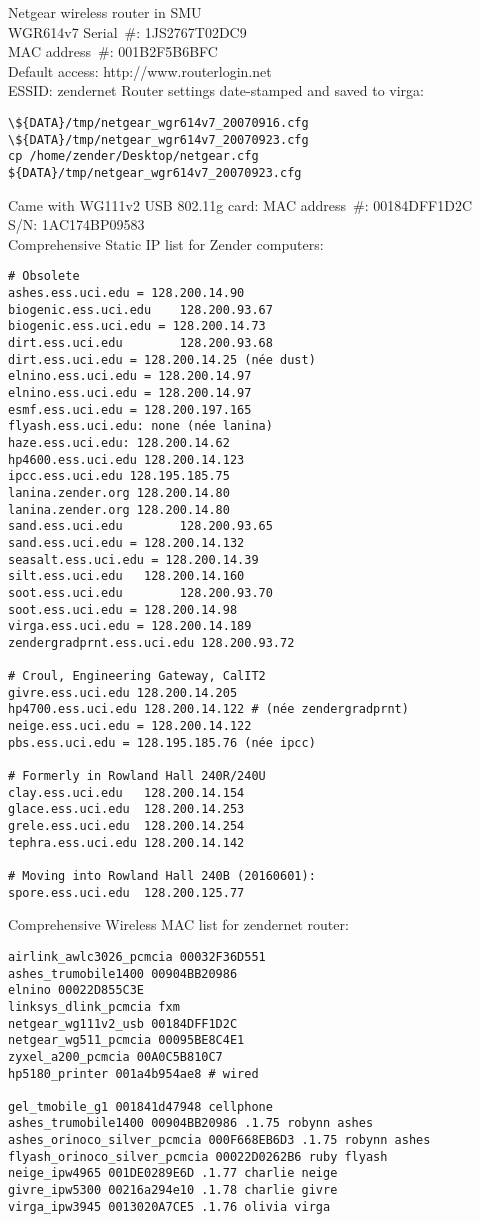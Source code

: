 \documentclass[12pt,twoside]{article}
\begin{document}
Netgear wireless router in SMU\\
WGR614v7
Serial~\#: 1JS2767T02DC9 \\
MAC address~\#: 001B2F5B6BFC \\
Default access: http://www.routerlogin.net \\
ESSID: zendernet
Router settings date-stamped and saved to virga: 
\begin{verbatim}
\${DATA}/tmp/netgear_wgr614v7_20070916.cfg
\${DATA}/tmp/netgear_wgr614v7_20070923.cfg
cp /home/zender/Desktop/netgear.cfg ${DATA}/tmp/netgear_wgr614v7_20070923.cfg
\end{verbatim}
Came with WG111v2 USB 802.11g card:
MAC address~\#: 00184DFF1D2C \\
S/N: 1AC174BP09583 \\

Comprehensive Static IP list for Zender computers:
\begin{verbatim}
# Obsolete
ashes.ess.uci.edu = 128.200.14.90
biogenic.ess.uci.edu    128.200.93.67
biogenic.ess.uci.edu = 128.200.14.73
dirt.ess.uci.edu        128.200.93.68
dirt.ess.uci.edu = 128.200.14.25 (née dust)
elnino.ess.uci.edu = 128.200.14.97
elnino.ess.uci.edu = 128.200.14.97
esmf.ess.uci.edu = 128.200.197.165
flyash.ess.uci.edu: none (née lanina)
haze.ess.uci.edu: 128.200.14.62
hp4600.ess.uci.edu 128.200.14.123
ipcc.ess.uci.edu 128.195.185.75
lanina.zender.org 128.200.14.80
lanina.zender.org 128.200.14.80
sand.ess.uci.edu        128.200.93.65
sand.ess.uci.edu = 128.200.14.132
seasalt.ess.uci.edu = 128.200.14.39
silt.ess.uci.edu   128.200.14.160
soot.ess.uci.edu        128.200.93.70
soot.ess.uci.edu = 128.200.14.98
virga.ess.uci.edu = 128.200.14.189
zendergradprnt.ess.uci.edu 128.200.93.72

# Croul, Engineering Gateway, CalIT2
givre.ess.uci.edu 128.200.14.205
hp4700.ess.uci.edu 128.200.14.122 # (née zendergradprnt)
neige.ess.uci.edu = 128.200.14.122
pbs.ess.uci.edu = 128.195.185.76 (née ipcc)

# Formerly in Rowland Hall 240R/240U
clay.ess.uci.edu   128.200.14.154
glace.ess.uci.edu  128.200.14.253
grele.ess.uci.edu  128.200.14.254
tephra.ess.uci.edu 128.200.14.142

# Moving into Rowland Hall 240B (20160601):
spore.ess.uci.edu  128.200.125.77
\end{verbatim}

Comprehensive Wireless MAC list for zendernet router:
\begin{verbatim}
airlink_awlc3026_pcmcia 00032F36D551
ashes_trumobile1400 00904BB20986
elnino 00022D855C3E
linksys_dlink_pcmcia fxm
netgear_wg111v2_usb 00184DFF1D2C
netgear_wg511_pcmcia 00095BE8C4E1
zyxel_a200_pcmcia 00A0C5B810C7
hp5180_printer 001a4b954ae8 # wired

gel_tmobile_g1 001841d47948 cellphone
ashes_trumobile1400 00904BB20986 .1.75 robynn ashes
ashes_orinoco_silver_pcmcia 000F668EB6D3 .1.75 robynn ashes
flyash_orinoco_silver_pcmcia 00022D0262B6 ruby flyash
neige_ipw4965 001DE0289E6D .1.77 charlie neige
givre_ipw5300 00216a294e10 .1.78 charlie givre
virga_ipw3945 0013020A7CE5 .1.76 olivia virga
\end{verbatim}
\end{document}
